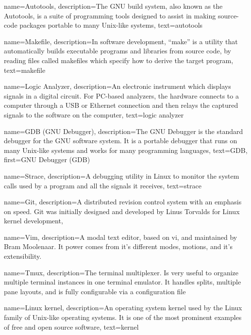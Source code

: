 {
  name=Autotools,
  description={The GNU build system, also known as the Autotools, is a
    suite of programming tools designed to assist in making
    source-code packages portable to many Unix-like systems},
  text=autotools
}

{
  name=Makefile,
  description={In software development, ``make'' is a utility that
    automatically builds executable programs and libraries from source
    code, by reading files called makefiles which specify how to
    derive the target program},
  text=makefile
}

{
  name=Logic Analyzer,
  description={An electronic instrument which displays signals in a
    digital circuit. For PC-based analyzers, the hardware connects to
    a computer through a USB or Ethernet connection and then relays
    the captured signals to the software on the computer},
  text=logic analyzer
}

{
  name=GDB (GNU Debugger),
  description={The GNU Debugger is the standard debugger for the GNU
    software system. It is a portable debugger that runs on many
    Unix-like systems and works for many programming languages},
  text=GDB,
  first=GNU Debugger (GDB)
}

{
  name=Strace,
  description={A debugging utility in Linux to monitor the system
    calls used by a program and all the signals it receives},
  text=strace
}

{
  name=Git,
  description={A distributed revision control system with an emphasis
    on speed. Git was initially designed and developed by Linus
    Torvalds for Linux kernel development},
}

{
  name=Vim,
  description={A modal text editor, based on vi, and maintained by Bram Moolenaar.
  It power comes from it's different modes, motions, and it's extensibility.}
}

{
  name=Tmux,
  description={The terminal multiplexer. Is very useful to organize multiple terminal instances in
  one terminal emulator. It handles splits, multiple pane layouts, and is fully configurable via a
  configuration file}
}

{
  name=Linux kernel,
  description={An operating system kernel used by the Linux family of
    Unix-like operating systems. It is one of the most prominent
    examples of free and open source software},
  text=kernel
}

